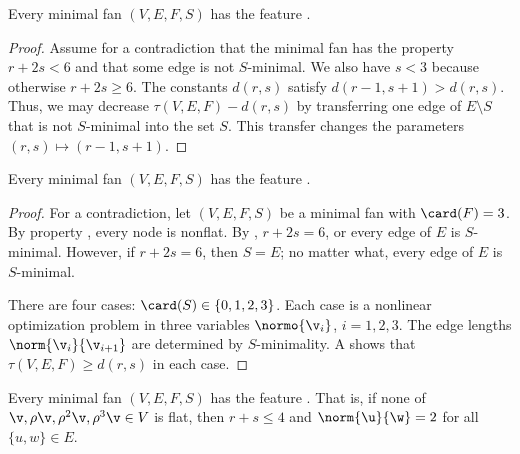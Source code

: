 \begin{lemma}[] 
Every minimal fan $(V,E,F,S)$ has the feature .
\end{lemma}

\begin{proof} Assume for a contradiction that the minimal fan has the
  property $r+2s < 6$ and that some edge is not $S$-minimal.  We also
  have $s<3$ because otherwise $r+2s\ge 6$.  The constants $d(r,s)$
  satisfy $d(r-1,s+1) > d(r,s)$.  Thus, we may decrease
  $\tau(V,E,F)-d(r,s)$ by transferring one edge of $E\setminus S$ that
  is not $S$-minimal into the set $S$.  This transfer changes the parameters
  $(r,s)\mapsto (r-1,s+1)$.
\end{proof}

\begin{lemma}[]\label{lemma:triangle-free}
Every minimal fan $(V,E,F,S)$ has the feature .
\end{lemma}

\begin{proof}
  For a contradiction, let $(V,E,F,S)$ be a minimal fan with
  $\card(F)=3$.  By property , every node is nonflat.
  By , $r+2s=6$, or every edge of $E$ is $S$-minimal.
  However, if $r+2s=6$, then $S=E$;  no matter what, every edge
  of $E$ is $S$-minimal.

There are four cases: $\card(S)\in\{0,1,2,3\}$.  Each case is a
nonlinear optimization problem in three variables $\normo{\v_i}$,
$i=1,2,3$.  The edge lengths $\norm{\v_i}{\v_{i+1}}$ are determined by
$S$-minimality.  A  shows that
$\tau(V,E,F)\ge d(r,s)$ in each case.
\end{proof}





\begin{lemma}[]\label{lemma:flat-exists}
Every minimal fan $(V,E,F,S)$ has the feature .
  That is, if none of $\v,\rho
\v,\rho^2 \v,\rho^3 \v\in V$ is flat, then $r+s\le 4$ and
$\norm{\u}{\w}=2$ for all $\{u,w\}\in E$.
\end{lemma}

